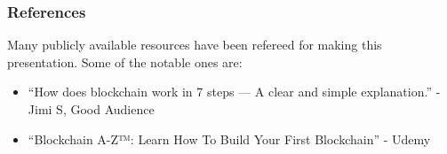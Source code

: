 \begin{frame}\frametitle{References}
Many publicly available resources have been refereed for making this presentation. Some of the notable ones are:
\small
\begin{itemize}
\item ``How does blockchain work in 7 steps — A clear and simple explanation.'' - Jimi S, Good Audience
\item ``Blockchain A-Z™: Learn How To Build Your First Blockchain'' - Udemy
\end{itemize}
\end{frame}
